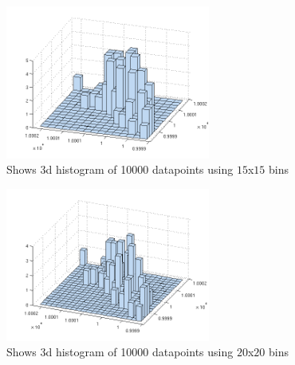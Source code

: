 \documentclass[a4paper, 10pt, final]{article}
\begin{document}
\begin{figure}[!ht]
  \centering
  \includegraphics[width=0.6\textwidth]{images/q1_4_10000_b15}
  \caption{Shows 3d histogram of 10000 datapoints using $15$x$15$ bins}
  \label{fig:q1_4_10000_b15}
\end{figure}

\begin{figure}[!ht]
  \centering
  \includegraphics[width=0.6\textwidth]{images/q1_4_10000_b20}
  \caption{Shows 3d histogram of 10000 datapoints using $20$x$20$ bins}
  \label{fig:q1_4_10000_b20}
\end{figure}



\newpage
\subsection*{\label{text:Code}}




%
%
\end{document}
